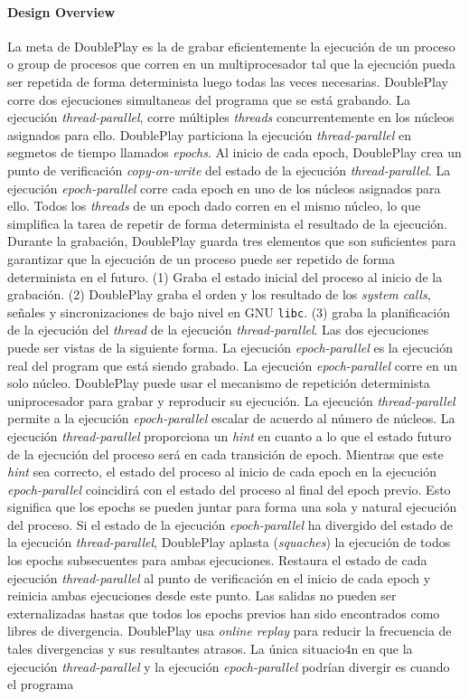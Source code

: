 \paragraph{\textnormal{\textbf{Design Overview}}}
La meta de DoublePlay es la de grabar eficientemente la ejecución de un proceso o group de procesos que corren en un multiprocesador tal que la ejecución pueda ser repetida de forma determinista luego todas las veces necesarias. DoublePlay corre dos ejecuciones simultaneas del programa que se está grabando. La ejecución \emph{thread-parallel}, corre múltiples \emph{threads} concurrentemente en los núcleos asignados para ello. DoublePlay particiona la ejecución \emph{thread-parallel} en segmetos de tiempo llamados \emph{epochs}. Al inicio de cada epoch, DoublePlay crea un punto de verificación \emph{copy-on-write} del estado de la ejecución \emph{thread-parallel}. La ejecución \emph{epoch-parallel} corre cada epoch en uno de los núcleos asignados para ello. Todos los \emph{threads} de un epoch dado corren en el mismo núcleo, lo que simplifica la tarea de repetir de forma determinista el resultado de la ejecución. Durante la grabación, DoublePlay guarda tres elementos que son suficientes para garantizar que la ejecución de un proceso puede ser repetido de forma determinista en el futuro. (1) Graba el estado inicial del proceso al inicio de la grabación. (2) DoublePlay graba el orden y los resultado de los \emph{system calls}, señales y sincronizaciones de bajo nivel en GNU \texttt{libc}. (3) graba la planificación de la ejecución del \emph{thread} de la ejecución \emph{thread-parallel}. Las dos ejecuciones puede ser vistas de la siguiente forma. La ejecución \emph{epoch-parallel} es la ejecución real del program que está siendo grabado. La ejecución \emph{epoch-parallel} corre en un solo núcleo. DoublePlay puede usar el mecanismo de repetición determinista uniprocesador para grabar y reproducir su ejecución. La ejecución \emph{thread-parallel} permite a la ejecución \emph{epoch-parallel} escalar de acuerdo al número de núcleos. La ejecución \emph{thread-parallel} proporciona un \emph{hint} en cuanto a lo que el estado futuro de la ejecución del proceso será en cada transición de epoch. Mientras que este \emph{hint} sea correcto, el estado del proceso al inicio de cada epoch en la ejecución \emph{epoch-parallel} coincidirá con el estado del proceso al final del epoch previo. Esto significa que los epochs se pueden juntar para forma una sola y natural ejecución del proceso. Si el estado de la ejecución \emph{epoch-parallel} ha divergido del estado de la ejecución \emph{thread-parallel}, DoublePlay aplasta (\emph{squaches}) la ejecución de todos los epochs subsecuentes para ambas ejecuciones. Restaura el estado de cada ejecución \emph{thread-parallel}  al punto de verificación en el inicio de cada epoch y reinicia ambas ejecuciones desde este punto. Las salidas no pueden ser externalizadas hastas que todos los epochs previos han sido encontrados como libres de divergencia. DoublePlay usa \emph{online  replay} para reducir la frecuencia de tales divergencias y sus resultantes atrasos. La única situacio4n en que la ejecución \emph{thread-parallel} y la ejecución \emph{epoch-parallel} podrían divergir es cuando el programa 